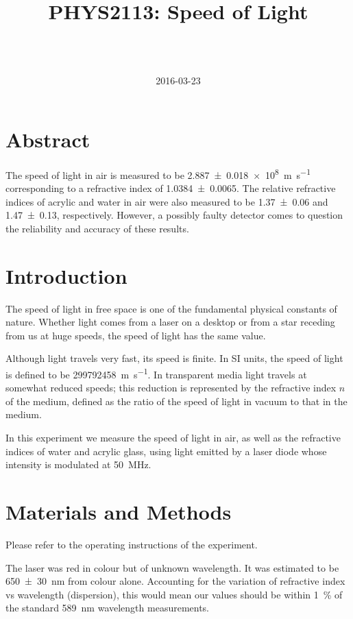 \documentclass[a4paper]{scrartcl}
\begin{document}
\title{PHYS2113: Speed of Light}
\author{ \\ \\ }
\date{2016-03-23}
\maketitle

\section{Abstract}
The speed of light in air is measured to be \SI{2.887 \pm 0.018e8}{\metre\per\second} corresponding to a refractive index of \SI{1.0384 \pm 0.0065}{}. The relative refractive indices of acrylic and water in air were also measured to be \SI{1.37 \pm 0.06}{} and \SI{1.47 \pm 0.13}{}, respectively. However, a possibly faulty detector comes to question the reliability and accuracy of these results.

\section{Introduction}
The speed of light in free space is one of the fundamental physical constants of nature. Whether light comes from a laser on a desktop or from a star receding from us at huge speeds, the speed of light has the same value.

Although light travels very fast, its speed is finite. In SI units, the speed of light is defined to be \SI{299792458}{\metre\per\second}. In transparent media light travels at somewhat reduced speeds; this reduction is represented by the refractive index \(n\) of the medium, defined as the ratio of the speed of light in vacuum to that in the medium.

In this experiment we measure the speed of light in air, as well as the refractive indices of water and acrylic glass, using light emitted by a laser diode whose intensity is modulated at \SI{50}{\mega\hertz}.

\section{Materials and Methods}
Please refer to the operating instructions of the experiment.

The laser was red in colour but of unknown wavelength. It was estimated to be \SI{650 \pm 30}{\nano\metre} from colour alone. Accounting for the variation of refractive index vs wavelength (dispersion), this would mean our values should be within \SI{1}{\percent} of the standard \SI{589}{\nano\metre} wavelength measurements.
\end{document}
